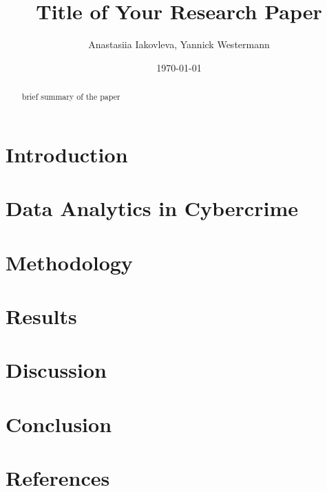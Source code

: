 \documentclass{article}
\title{Title of Your Research Paper}
\author{Anastasiia Iakovleva, Yannick Westermann}
\date{\today}
\begin{document}
\maketitle

\begin{abstract}
brief summary of the paper
\end{abstract}

\section{Introduction}\label{sec:introduction}


\section{Data Analytics in Cybercrime}\label{sec:data-analytics}


\section{Methodology}\label{sec:methodology}


\section{Results}\label{sec:results}


\section{Discussion}\label{sec:discussion}


\section{Conclusion}\label{sec:conclusion}


\section*{References}\label{sec:references}

\end{document}
